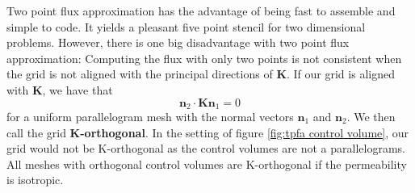 \documentclass[../Main/main.tex]{subfiles}
\begin{document}
	 Two point flux approximation has the advantage of being fast to assemble and simple to code. It yields a pleasant five point stencil for two dimensional problems. However, there is one big disadvantage with two point flux approximation: Computing the flux with only two points is not consistent when the grid is not aligned with the principal directions of $\bm{K}$. If our grid is aligned with $\bm{K}$, we have that 
	\begin{equation}
		\bm{n}_2 \cdot \bm{K}\bm{n}_1 = 0
	\end{equation}
	for a uniform parallelogram mesh with the normal vectors $\bm{n}_1$ and $\bm{n}_2$. We then call the grid \textbf{K-orthogonal}. 
	 In the setting of figure \ref{fig:tpfa control volume}, our grid would not be K-orthogonal as the control volumes are not a parallelograms. All meshes with orthogonal control volumes are K-orthogonal if the permeability is isotropic.
\end{document}
